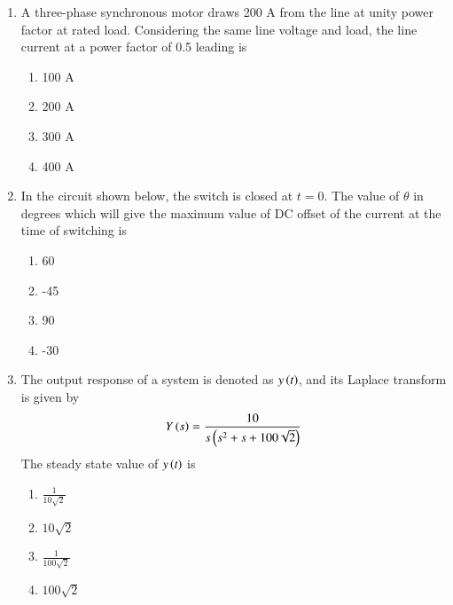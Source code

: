 \documentclass[journal]{IEEEtran}
\begin{document}
\begin{enumerate}
    \item A three-phase synchronous motor draws 200 A from the line at unity power factor
    at rated load. Considering the same line voltage and load, the line current at a power
    factor of 0.5 leading is
    \begin{multicols}{4}
    \begin{enumerate}
        \item 100 A
        \item 200 A
        \item 300 A
        \item 400 A
    \end{enumerate}
    \end{multicols}
    
    \item In the circuit shown below, the switch is closed at $t=0$. The value of $\theta$
    in degrees which will give the maximum value of DC offset of the current at the time of switching is
    
    
    
    \begin{multicols}{4}
    \begin{enumerate}
        \item 60
        \item -45
        \item 90
        \item -30
    \end{enumerate}
    \end{multicols}

    \item The output response of a system is denoted as $y\left(t\right)$, and its Laplace transform is given by
    \begin{align*}
    Y\left(s\right) = \frac{10}{s\left(s^2 + s + 100\sqrt{2}\right)}
    \end{align*}
    The steady state value of $y\left(t\right)$ is
    \begin{multicols}{4}
    \begin{enumerate}
        \item $\frac{1}{10\sqrt{2}}$
        \item $10\sqrt{2}$
        \item $\frac{1}{100\sqrt{2}}$
        \item $100\sqrt{2}$
    \end{enumerate}
    \end{multicols}


\end{enumerate}
\end{document}
